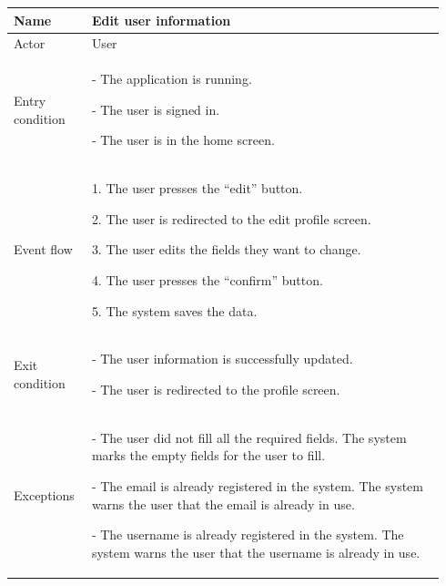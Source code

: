 \begin{table}[H]
\begin{tabular}{|p{0.17\linewidth}|p{0.77\linewidth}|}
\hline
Name            & Edit user information
\\ \hline

Actor           & User
\\ \hline

Entry condition &
- The application is running.

- The user is signed in.

- The user is in the home screen.
\\ \hline
Event flow      & 
    1. The user presses the “edit” button.

    2. The user is redirected to the edit profile screen.

    3. The user edits the fields they want to change.

    4. The user presses the “confirm” button.
    
    5. The system saves the data.
\\ \hline
Exit condition  & 
    - The user information is successfully updated.

    - The user is redirected to the profile screen.
\\ \hline
Exceptions      &
    - The user did not fill all the required fields. The system marks the empty fields for the user to fill.

    - The email is already registered in the system. The system warns the user that the email is already in use.

    - The username is already registered in the system. The system warns the user that the username is already in use.
\\ \hline
\end{tabular}
\end{table}

